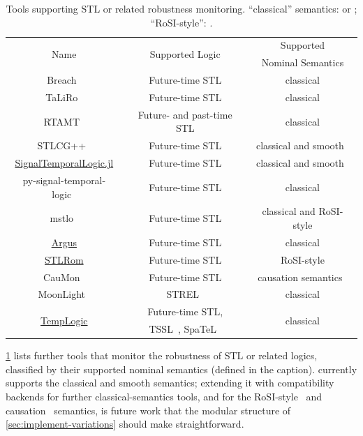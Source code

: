 \begin{table}[tp]
 \centering
 \caption{Tools supporting STL or related robustness monitoring.
  ``classical'' semantics: \cite{donze2010robust} or \cite{fainekos2009robustness};
  ``RoSI-style'': \cite{deshmukh2017online}.}
 \label{table:detailed_tool_comparison}
 \footnotesize
 \begin{tabular}{ccc}
  \toprule
  \multirow{2}{*}{Name} & \multirow{2}{*}{Supported Logic} & Supported \\
          &       & Nominal Semantics    \\\midrule
  Breach~\cite{donze2010breach}  & Future-time STL & classical \\
  TaLiRo~\cite{annpureddy2011staliro}  & Future-time STL & classical \\
  RTAMT~\cite{nickovic2024rtamt} & Future- and past-time STL & classical \\
  STLCG++~\cite{kapoor2025stlcgpp} & Future-time STL & classical and smooth~\cite{levenberg2020stlcg,pant2017smooth} \\
  \href{https://github.com/sisl/SignalTemporalLogic.jl}{SignalTemporalLogic.jl} & Future-time STL & classical and smooth~\cite{levenberg2020stlcg,pant2017smooth} \\
  py-signal-temporal-logic~\cite{pyMTL} & Future-time STL & classical \\
  mstlo~\cite{thomsen2026mstlo} & Future-time STL & classical and RoSI-style \\
  \href{https://github.com/anand-bala/argus}{Argus}   & Future-time STL & classical \\
  \href{https://github.com/decyphir/STLRom}{STLRom}  & Future-time STL & RoSI-style \\
  CauMon~\cite{CauMon}  & Future-time STL & causation semantics~\cite{DBLP:conf/cav/ZhangAAH23} \\
  MoonLight~\cite{bartocci2023moonlight} & STREL~\cite{DBLP:conf/memocode/BartocciBLN17} & classical \\
  \multirow{2}{*}{\href{https://github.com/fran-penedo/templogic}{TempLogic}}  & Future-time STL, & \multirow{2}{*}{classical} \\
  & TSSL~\cite{DBLP:journals/tcns/BartocciGHB18}, SpaTeL~\cite{DBLP:conf/hybrid/HaghighiJKBGB15} & \\\bottomrule
 \end{tabular}
\end{table}

\cref{table:detailed_tool_comparison} lists further tools that monitor the
robustness of STL or related logics, classified by their supported nominal
semantics (defined in the caption). \tool{} currently supports the classical and
smooth semantics; extending it with compatibility backends for further
classical-semantics tools, and for the RoSI-style~\cite{deshmukh2017online} and
causation~\cite{DBLP:conf/cav/ZhangAAH23} semantics, is future work that the
modular structure of \cref{sec:implement-variations} should make
straightforward.

